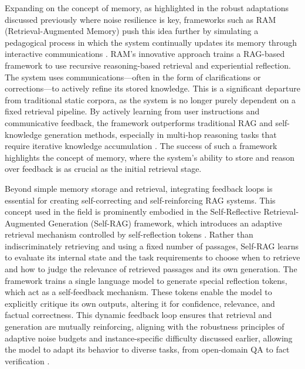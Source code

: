 \documentclass[11pt]{article}
\begin{document}
Expanding on the concept of memory, as highlighted in the robust adaptations discussed previously where noise resilience is key, frameworks such as RAM (Retrieval-Augmented Memory) push this idea further by simulating a pedagogical process in which the system continually updates its memory through interactive communications \cite{ref55}. RAM's innovative approach trains a RAG-based framework to use recursive reasoning-based retrieval and experiential reflection. The system uses communications---often in the form of clarifications or corrections---to actively refine its stored knowledge. This is a significant departure from traditional static corpora, as the system is no longer purely dependent on a fixed retrieval pipeline. By actively learning from user instructions and communicative feedback, the framework outperforms traditional RAG and self-knowledge generation methods, especially in multi-hop reasoning tasks that require iterative knowledge accumulation \cite{ref55}. The success of such a framework highlights the concept of memory, where the system's ability to store and reason over feedback is as crucial as the initial retrieval stage.

Beyond simple memory storage and retrieval, integrating feedback loops is essential for creating self-correcting and self-reinforcing RAG systems. This concept used in the field is prominently embodied in the Self-Reflective Retrieval-Augmented Generation (Self-RAG) framework, which introduces an adaptive retrieval mechanism controlled by self-reflection tokens \cite{ref109}. Rather than indiscriminately retrieving and using a fixed number of passages, Self-RAG learns to evaluate its internal state and the task requirements to choose when to retrieve and how to judge the relevance of retrieved passages and its own generation. The framework trains a single language model to generate special reflection tokens, which act as a self-feedback mechanism. These tokens enable the model to explicitly critique its own outputs, altering it for confidence, relevance, and factual correctness. This dynamic feedback loop ensures that retrieval and generation are mutually reinforcing, aligning with the robustness principles of adaptive noise budgets and instance-specific difficulty discussed earlier, allowing the model to adapt its behavior to diverse tasks, from open-domain QA to fact verification \cite{ref109}.
\end{document}
